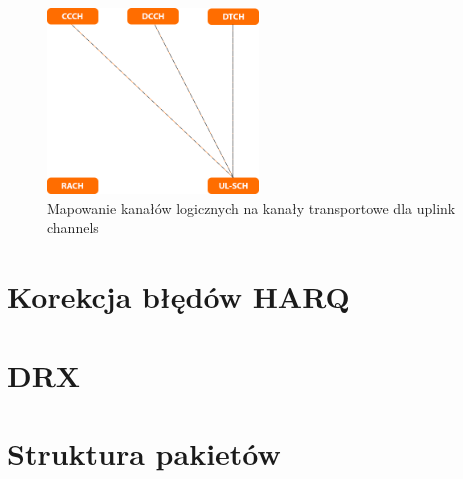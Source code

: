 \begin{figure}
	\centerline{\includegraphics[width=0.5\textwidth]{images/mac_uplink_mapping.png}}
	\caption{Mapowanie kanałów logicznych na kanały transportowe dla uplink channels}
	\label{fig:mac_uplink_mapping}
\end{figure}

\section{Korekcja błędów HARQ}

\section{DRX}

\section{Struktura pakietów}
